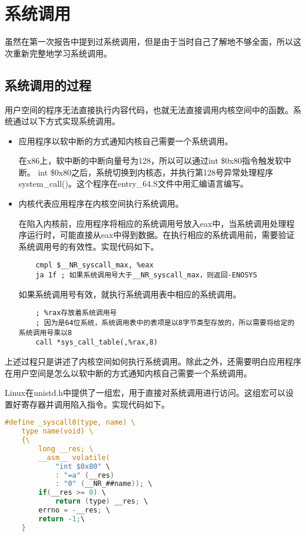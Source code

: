 \documentclass[a4paper,left=2.5cm,right=2.5cm,11pt]{article}
\begin{document}
\section{系统调用}
	虽然在第一次报告中提到过系统调用，但是由于当时自己了解地不够全面，所以这次重新完整地学习系统调用。
\subsection{系统调用的过程}
	用户空间的程序无法直接执行内容代码，也就无法直接调用内核空间中的函数。系统通过以下方式实现系统调用。
	\begin{itemize}
		\item 应用程序以软中断的方式通知内核自己需要一个系统调用。\par
			  在x86上，软中断的中断向量号为128，所以可以通过int \$0x80指令触发软中断。
			  int \$0x80之后，系统切换到内核态，并执行第128号异常处理程序system\_call()。这个程序在entry\_64.S文件中用汇编语言编写。
		\item 内核代表应用程序在内核空间执行系统调用。\par
			  在陷入内核前，应用程序将相应的系统调用号放入eax中，当系统调用处理程序运行时，可能直接从eax中得到数据。在执行相应的系统调用前，需要验证系统调用号的有效性。实现代码如下。
			  \begin{lstlisting}
	cmpl $__NR_syscall_max, %eax
	ja 1f ; 如果系统调用号大于__NR_syscall_max，则返回-ENOSYS
			  \end{lstlisting}
			  如果系统调用号有效，就执行系统调用表中相应的系统调用。
			  \begin{lstlisting}
	; %rax存放着系统调用号
	; 因为是64位系统，系统调用表中的表项是以8字节类型存放的，所以需要将给定的系统调用号乘以8
	call *sys_call_table(,%rax,8)
			  \end{lstlisting}
	\end{itemize}

	上述过程只是讲述了内核空间如何执行系统调用。除此之外，还需要明白应用程序在用户空间是怎么以软中断的方式通知内核自己需要一个系统调用。\par
	Linux在unistd.h中提供了一组宏，用于直接对系统调用进行访问。这组宏可以设置好寄存器并调用陷入指令。实现代码如下。
	\begin{lstlisting}[language=C]
	#define _syscall0(type, name) \
	type name(void) \
	{\
		long __res; \
		__asm__ volatile(
			"int $0x80" \
			: "=a" (__res)
			: "0" (__NR_##name)); \
		if(__res >= 0) \
			return (type) __res; \
		errno = -__res; \
		return -1;\
	}
	\end{lstlisting}
\end{document}
